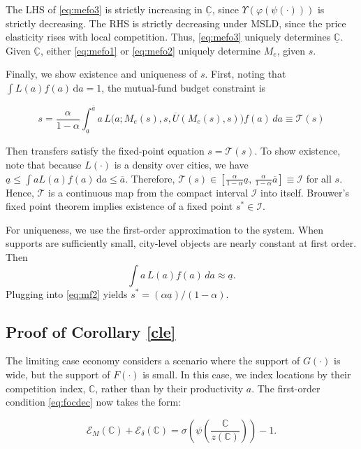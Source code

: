 The LHS of \eqref{eq:mefo3} is strictly increasing in $\underline{\mathbb{C}}$, since $\Upsilon\left(\varphi\left(\psi\left(\cdot\right)\right)\right)$ is strictly decreasing. The RHS is strictly decreasing under MSLD, since the price elasticity rises with local competition. Thus, \eqref{eq:mefo3} uniquely determines $\underline{\mathbb{C}}$. Given $\underline{\mathbb{C}}$, either \eqref{eq:mefo1} or \eqref{eq:mefo2} uniquely determine $M_e$, given $s$.

Finally, we show existence and uniqueness of $s$. First, noting that $\int L(a)f(a)\,\mathrm da=1$, the mutual-fund budget constraint is

\begin{equation}\label{eq:mf2}
s=\frac{\alpha}{1-\alpha}\int_{\underline a}^{\overline a}a\,L\big(a;M_e(s),s,\overline U(M_e(s),s)\big)f(a)\, da \equiv \mathcal T(s)
\end{equation}

Then transfers satisfy the fixed-point equation $s=\mathcal T(s)$. To show existence, note that because $L(\cdot)$ is a density over cities, we have $\underline a\le \int aL(a)f(a)\,\mathrm da\le \overline a$. Therefore, 
$\mathcal T(s)\in\left[\frac{\alpha}{1-\alpha}\underline a,\,\frac{\alpha}{1-\alpha}\overline a\right] \equiv \mathcal{I}$ for all $s$. Hence, $\mathcal T$ is a continuous map from the compact interval $\mathcal I$ into itself. Brouwer's fixed point theorem implies existence of a fixed point $s^*\in\mathcal I$.

For uniqueness, we use the first-order approximation to the system. When supports are sufficiently small, city-level objects are nearly constant at first order. Then
\begin{equation*}
\int a\,L(a)f(a)\, da \approx \underline a.
\end{equation*}
Plugging into \eqref{eq:mf2} yields $s^*= (\alpha \underline a)/(1-\alpha)$.

\subsection{Proof of Corollary \ref{cle}}\label{proof:cle}
The limiting case economy considers a scenario where the support of $G(\cdot)$ is wide, but the support of $F(\cdot)$ is small. In this case, we index locations by their competition index, $\mathbb{C}$, rather than by their productivity $a$. The first-order condition \eqref{eq:focdec} now takes the form:

\begin{equation*}
    \mathcal{E}_{M}(\mathbb{C}) + \mathcal{E}_{\delta}(\mathbb{C}) = \sigma\left(\psi\left(\frac{\mathbb{C}}{z(\mathbb{C})}\right)\right) -1.
\end{equation*}

